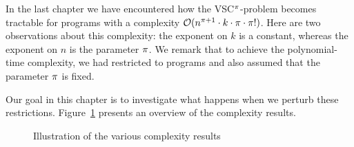
In the last chapter we have encountered how the VSC$^\pi$-problem becomes tractable for \onewriter{} programs with a complexity $\mathcal{O}(n^{\pi + 1} \cdot k \cdot \pi \cdot \pi!)$. Here are two observations about this complexity: the exponent on $k$ is a constant, whereas the exponent on $n$ is the parameter $\pi$. We remark that to achieve the polynomial-time complexity, we had restricted to \onewriter{}  programs and also assumed that the parameter $\pi$ is fixed. 

Our goal in this chapter is to investigate what happens when we perturb these restrictions. Figure~\ref{fig:results-overview} presents an overview of the complexity results.

\begin{figure}[h]
\centering
{}
\caption{Illustration of the various complexity results}
\label{fig:results-overview}
\end{figure}

